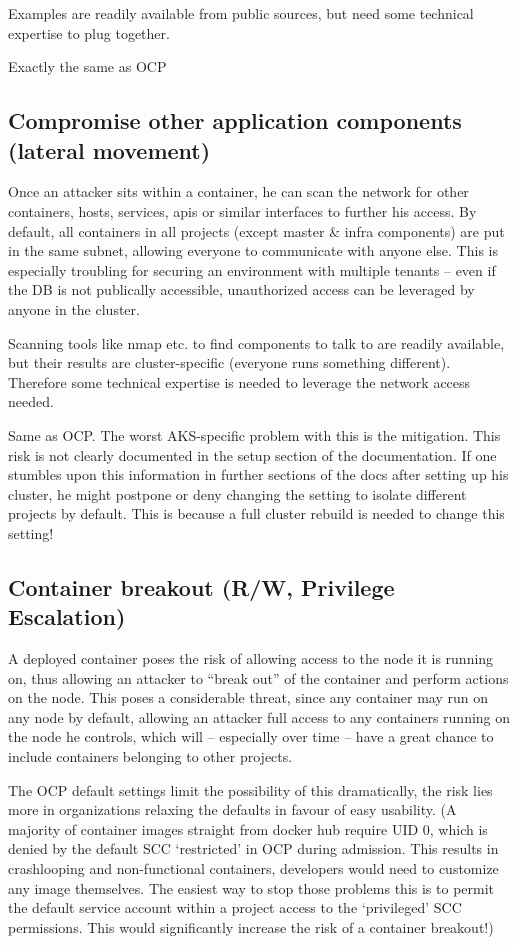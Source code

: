 Examples are readily available from public sources, but need some technical expertise to plug together.

Exactly the same as OCP

\subsection{Compromise other application components (lateral movement)}
Once an attacker sits within a container, he can scan the network for other containers, hosts, services, apis or similar interfaces to further his access. By default, all containers in all projects (except master & infra components) are put in the same subnet, allowing everyone to communicate with anyone else.
This is especially troubling for securing an environment with multiple tenants – even if the DB is not publically accessible, unauthorized access can be leveraged by anyone in the cluster.

Scanning tools like nmap etc. to find components to talk to are readily available, but their results are cluster-specific (everyone runs something different). Therefore some technical expertise is needed to leverage the network access needed. 

Same as OCP. 
The worst AKS-specific problem with this is the mitigation. This risk is not clearly documented in the setup section of the documentation. If one stumbles upon this information in further sections of the docs after setting up his cluster, he might postpone or deny changing the setting to isolate different projects by default. This is because a full cluster rebuild is needed to change this setting!

\subsection{Container breakout (R/W, Privilege Escalation)}
A deployed container poses the risk of allowing access to the node it is running on, thus allowing an attacker to “break out” of the container and perform actions on the node.
This poses a considerable threat, since any container may run on any node by default, allowing an attacker full access to any containers running on the node he controls, which will – especially over time – have a great chance to include containers belonging to other projects.

The OCP default settings limit the possibility of this dramatically, the risk lies more in organizations relaxing the defaults in favour of easy usability. (A majority of container images straight from docker hub require UID 0, which is denied by the default SCC ‘restricted’ in OCP during admission. This results in crashlooping and non-functional containers, developers would need to customize any image themselves. The easiest way to stop those problems this is to permit the default service account within a project access to the ‘privileged’ SCC permissions. This would significantly increase the risk of a container breakout!)

